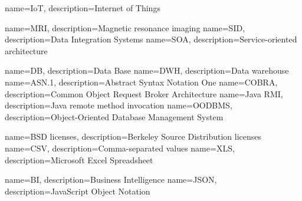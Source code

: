 \makeglossaries
 
{
    name=IoT,
    description={Internet of Things}
}
 

{
    name=MRI,
    description={Magnetic resonance imaging}
}
{
    name=SID,
    description={Data Integration Systems}
}
{
    name=SOA,
    description={Service-oriented architecture}
}
 
 
 
{
    name=DB,
    description={Data Base}
}
{
    name=DWH,
    description={Data warehouse}
}
{
    name=ASN.1,
    description={Abstract Syntax Notation One}
}
{
    name=COBRA,
    description={Common Object Request Broker Architecture}
}
{
    name=Java RMI,
    description={Java remote method invocation}
}
{
    name=OODBMS,
    description={Object-Oriented Database Management System}
}

{
    name=BSD licenses,
    description={Berkeley Source Distribution licenses}
}
{
    name=CSV,
    description={Comma-separated values}
}
{
    name=XLS,
    description={Microsoft Excel Spreadsheet}
}
 
{
    name=BI,
    description={Business Intelligence}
}
{
    name=JSON,
    description={JavaScript Object Notation}
}
